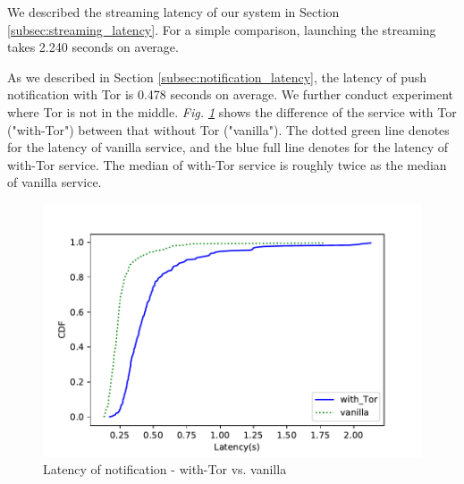 
We described the streaming latency of our system in Section \ref{subsec:streaming_latency}. For a simple comparison, launching the streaming takes 2.240 seconds on average.


As we described in Section \ref{subsec:notification_latency}, the latency of push notification with Tor is 0.478 seconds on average. We further conduct experiment where Tor is not in the middle. \textit{Fig. \ref{fig:notificationlatency_wTor_vs_vanilla}} shows the difference of the service with Tor ("with-Tor") between that without Tor ("vanilla"). The dotted green line denotes for the latency of vanilla service, and the blue full line denotes for the latency of with-Tor service. The median of with-Tor service is roughly twice as the median of vanilla service.

\begin{figure}
	\includegraphics[width=\linewidth]{plot_push_tor_vs_vanilla.pdf}
	\caption{Latency of notification - with-Tor vs. vanilla}
	\label{fig:notificationlatency_wTor_vs_vanilla}
\end{figure}